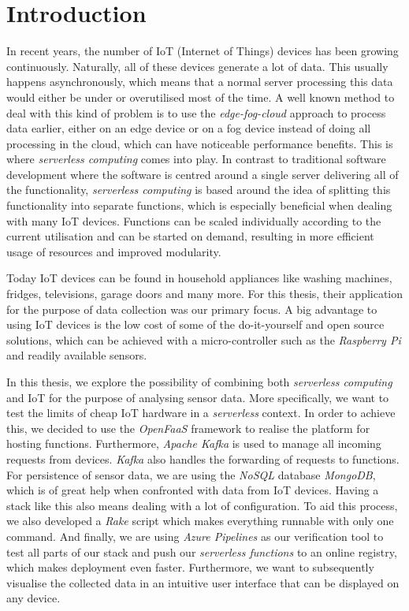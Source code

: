 \chapter{Introduction}
\label{sec:introduction}

In recent years, the number of IoT (Internet of Things) devices has been growing continuously.
Naturally, all of these devices generate a lot of data. This usually happens asynchronously, which
means that a normal server processing this data would either be under or overutilised most of the
time. A well known method to deal with this kind of problem is to use the \textit{edge-fog-cloud}
approach to process data earlier, either on an edge device or on a fog device instead of doing all
processing in the cloud, which can have noticeable performance benefits. This is where
\textit{serverless computing} comes into play. In contrast to traditional software development where
the software is centred around a single server delivering all of the functionality,
\textit{serverless computing} is based around the idea of splitting this functionality into separate
functions, which is especially beneficial when dealing with many IoT devices. Functions can be
scaled individually according to the current utilisation and can be started on demand, resulting in
more efficient usage of resources and improved modularity.

Today IoT devices can be found in household appliances like washing machines, fridges, televisions,
garage doors and many more. For this thesis, their application for the purpose of data collection
was our primary focus. A big advantage to using IoT devices is the low cost of some of the
do-it-yourself and open source solutions, which can be achieved with a
micro-controller such as the \textit{Raspberry Pi} and readily available
 sensors.

In this thesis, we explore the possibility of combining both \textit{serverless computing} and IoT
for the purpose of analysing sensor data. More specifically, we want to test the limits of cheap IoT
hardware in a \textit{serverless} context. In order to achieve this, we decided to use the
\textit{OpenFaaS} framework to realise the platform for hosting functions. Furthermore,
\textit{Apache Kafka} is used to manage all incoming requests from devices. \textit{Kafka} also
handles the forwarding of requests to functions. For persistence of sensor data, we are using the
\textit{NoSQL} database \textit{MongoDB}, which is of great help when confronted with data from
IoT devices. Having a stack like this also means dealing with a lot of configuration. To
aid this process, we also developed a \textit{Rake} script which makes everything runnable with only
one command. And finally, we are using \textit{Azure Pipelines} as our verification tool to test all
parts of our stack and push our \textit{serverless functions} to an online registry, which makes
deployment even faster. Furthermore, we want to subsequently visualise the collected data in an
intuitive user interface that can be displayed on any device.

